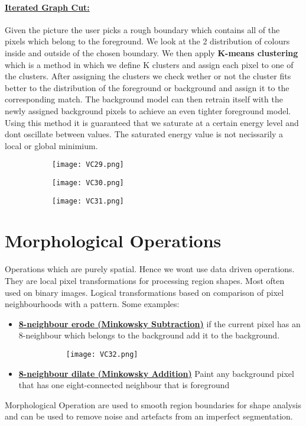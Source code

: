 \documentclass[8pt]{extreport}
\begin{document}
\paragraph{\underline{Iterated Graph Cut:}} Given the picture the user picks a rough boundary which contains all of the pixels which belong to the foreground. We look at the 2 distribution of colours inside and outside of the chosen boundary. We then apply \textbf{K-means clustering} which is a method in which we define K clusters and assign each pixel to one of the clusters. After assigning the clusters we check wether or not the cluster fits better to the distribution of the foreground or background and assign it to the corresponding match. The background model can then retrain itself with the newly assigned background pixels to achieve an even tighter foreground model. Using this method it is guaranteed that we saturate at a certain energy level and dont oscillate between values. The saturated energy value is not necissarily a local or global minimium.
\begin{figure}[H]
\centering
\begin{subfigure}[b]{0.32\linewidth}
\texttt{[image: VC29.png]}
\end{subfigure}
\begin{subfigure}[b]{0.32\linewidth}
\texttt{[image: VC30.png]}
\end{subfigure}
\begin{subfigure}[b]{0.32  \linewidth}
\texttt{[image: VC31.png]}
\end{subfigure}
\end{figure}

\section{Morphological Operations}

Operations which are purely spatial. Hence we wont use data driven operations. They are local pixel transformations for processing region shapes. Most often used on binary images. Logical transformations based on comparison of pixel neighbourhoods with a pattern.
Some examples:
\begin{itemize}
\item \underline{\textbf{8-neighbour erode (Minkowsky Subtraction)}} if the current pixel has an 8-neighbour which belongs to the background add it to the background.
\begin{figure}[H]
\centering
\begin{subfigure}[b]{0.32\linewidth}
\texttt{[image: VC32.png]}
\end{subfigure}
\end{figure}
\item  \underline{\textbf{8-neighbour dilate (Minkowsky Addition)}} Paint any background pixel that has one eight-connected neighbour that is foreground 
\end{itemize}
Morphological Operation are used to smooth region boundaries for shape analysis and can be used to remove noise and artefacts from an imperfect segmentation.
\end{document}
